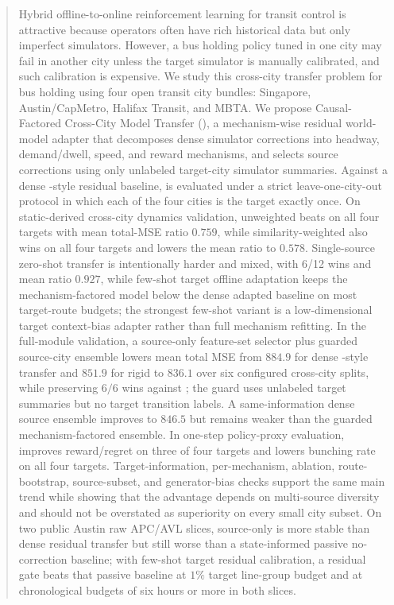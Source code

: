 \begin{abstract}
Hybrid offline-to-online reinforcement learning for transit control is attractive because operators often have rich historical data but only imperfect simulators.
However, a bus holding policy tuned in one city may fail in another city unless the target simulator is manually calibrated, and such calibration is expensive.
We study this cross-city transfer problem for bus holding using four open transit city bundles: Singapore, Austin/CapMetro, Halifax Transit, and MBTA.
We propose Causal-Factored Cross-City Model Transfer (\ours), a mechanism-wise residual world-model adapter that decomposes dense simulator corrections into headway, demand/dwell, speed, and reward mechanisms, and selects source corrections using only unlabeled target-city simulator summaries.
Against a dense \Htwo-style residual baseline, \ours is evaluated under a strict leave-one-city-out protocol in which each of the four cities is the target exactly once.
On static-derived cross-city dynamics validation, unweighted \ours beats \Htwo on all four targets with mean total-MSE ratio $0.759$, while similarity-weighted \ours also wins on all four targets and lowers the mean ratio to $0.578$.
Single-source zero-shot transfer is intentionally harder and mixed, with 6/12 wins and mean ratio $0.927$, while few-shot target offline adaptation keeps the mechanism-factored model below the dense adapted baseline on most target-route budgets; the strongest few-shot variant is a low-dimensional target context-bias adapter rather than full mechanism refitting.
In the full-module validation, a source-only feature-set selector plus guarded source-city ensemble lowers mean total MSE from $884.9$ for dense \Htwo-style transfer and $851.9$ for rigid \ours to $836.1$ over six configured cross-city splits, while preserving $6/6$ wins against \Htwo; the guard uses unlabeled target summaries but no target transition labels.
A same-information dense \Htwo source ensemble improves to $846.5$ but remains weaker than the guarded mechanism-factored ensemble.
In one-step policy-proxy evaluation, \ours improves reward/regret on three of four targets and lowers bunching rate on all four targets.
Target-information, per-mechanism, ablation, route-bootstrap, source-subset, and generator-bias checks support the same main trend while showing that the advantage depends on multi-source diversity and should not be overstated as superiority on every small city subset.
On two public Austin raw APC/AVL slices, source-only \ours is more stable than dense residual transfer but still worse than a state-informed passive no-correction baseline; with few-shot target residual calibration, a residual gate beats that passive baseline at $1\%$ target line-group budget and at chronological budgets of six hours or more in both slices.

\end{abstract}
